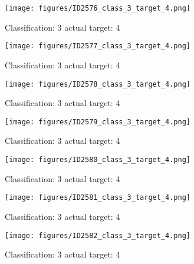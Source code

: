 \begin{figure}[h!]
\begin{center}
\texttt{[image: figures/ID2576\_class\_3\_target\_4.png]}
\end{center}
\caption{ Classification: 3 actual target: 4}
\label{fig:ID2576_class_3_target_4}
\end{figure}
\begin{figure}[h!]
\begin{center}
\texttt{[image: figures/ID2577\_class\_3\_target\_4.png]}
\end{center}
\caption{ Classification: 3 actual target: 4}
\label{fig:ID2577_class_3_target_4}
\end{figure}
\begin{figure}[h!]
\begin{center}
\texttt{[image: figures/ID2578\_class\_3\_target\_4.png]}
\end{center}
\caption{ Classification: 3 actual target: 4}
\label{fig:ID2578_class_3_target_4}
\end{figure}
\begin{figure}[h!]
\begin{center}
\texttt{[image: figures/ID2579\_class\_3\_target\_4.png]}
\end{center}
\caption{ Classification: 3 actual target: 4}
\label{fig:ID2579_class_3_target_4}
\end{figure}
\begin{figure}[h!]
\begin{center}
\texttt{[image: figures/ID2580\_class\_3\_target\_4.png]}
\end{center}
\caption{ Classification: 3 actual target: 4}
\label{fig:ID2580_class_3_target_4}
\end{figure}
\begin{figure}[h!]
\begin{center}
\texttt{[image: figures/ID2581\_class\_3\_target\_4.png]}
\end{center}
\caption{ Classification: 3 actual target: 4}
\label{fig:ID2581_class_3_target_4}
\end{figure}
\begin{figure}[h!]
\begin{center}
\texttt{[image: figures/ID2582\_class\_3\_target\_4.png]}
\end{center}
\caption{ Classification: 3 actual target: 4}
\label{fig:ID2582_class_3_target_4}
\end{figure}
